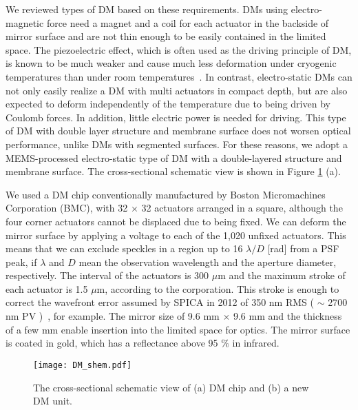 \documentclass[a4paper]{article}
\begin{document}
We reviewed types of DM based on these requirements. DMs using electro-magnetic force need a magnet and a coil for each actuator in the backside of mirror surface and are not thin enough to be easily contained in the limited space. The piezoelectric effect, which is often used as the driving principle of DM, is known to be much weaker and cause much less deformation under cryogenic temperatures than under room temperatures~\cite{piezo}. In contrast, electro-static DMs can not only easily realize a DM with multi actuators in compact depth, but are also expected to deform independently of the temperature due to being driven by Coulomb forces. In addition, little electric power is needed for driving. This type of DM with double layer structure and membrane surface does not worsen optical performance, unlike DMs with segmented surfaces. For these reasons, we adopt a MEMS-processed electro-static type of DM with a double-layered structure and membrane surface. The cross-sectional schematic view is shown in Figure \ref{DM_shem} (a).

We used a DM chip conventionally manufactured by Boston Micromachines Corporation (BMC), with 32 $\times$ 32 actuators arranged in a square, although the four corner actuators cannot be displaced due to being fixed. We can deform the mirror surface by applying a voltage to each of the 1,020 unfixed actuators. This means that we can exclude speckles in a region up to 16 $\lambda/D$ [rad] from a PSF peak, if $\lambda$ and $D$ mean the observation wavelength and the aperture diameter, respectively. The interval of the actuators is 300 $\mu$m and the maximum stroke of each actuator is 1.5 $\mu$m, according to the corporation. This stroke is enough to correct the wavefront error assumed by SPICA in 2012 of 350 nm RMS ( $\sim$ 2700 nm PV )~\cite{SPICA_WFE}, for example. The mirror size of 9.6 mm $\times$ 9.6 mm and the thickness of a few mm enable insertion into the limited space for optics. The mirror surface is coated in gold, which has a reflectance above 95 $\%$ in infrared. 

\begin{figure}[tb]
\centering
\texttt{[image: DM\_shem.pdf]}
\caption{The cross-sectional schematic view of (a) DM chip and (b) a new DM unit.}
\label{DM_shem}
\end{figure}
\end{document}
